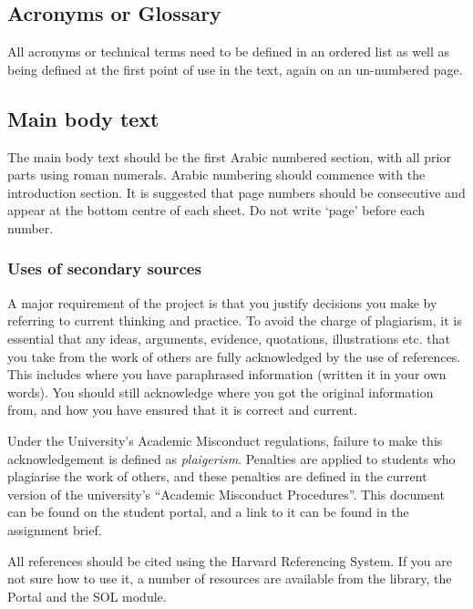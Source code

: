 \subsection{Acronyms or Glossary}

All acronyms or technical terms need to be defined in an ordered list as well as being defined at the first point of use in the text, again on an un-numbered page.

\subsection{Main body text}

The main body text should be the first Arabic numbered section, with all prior parts using roman numerals. Arabic numbering should commence with the introduction section. It is suggested that page numbers should be consecutive and appear at the bottom centre of each sheet. Do not write ‘page’ before each number.

\subsubsection{Uses of secondary sources}

A major requirement of the project is that you justify decisions you make by referring to current thinking and practice. To avoid the charge of plagiarism, it is essential that any ideas, arguments, evidence, quotations, illustrations etc. that you take from the work of others are fully acknowledged by the use of references. This includes where you have paraphrased information (written it in your own words). You should still acknowledge where you got the original information from, and how you have ensured that it is correct and current.

\begin{tcolorbox}
    Under the University’s Academic Misconduct regulations, failure to make this acknowledgement is defined as \textit{plaigerism}. Penalties are applied to students who plagiarise the work of others, and these penalties are defined in the current version of the university’s “Academic Misconduct Procedures”. This document can be found on the student portal, and a link to it can be found in the assignment brief.
\end{tcolorbox}

All references should be cited using the Harvard Referencing System. If you are not sure how to use it, a number of resources are available from the library, the Portal and the SOL module.

